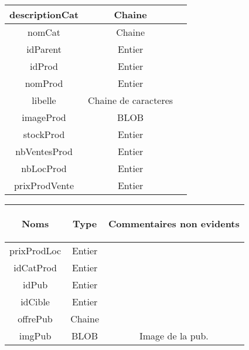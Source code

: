 \begin{tabular}{|c|c|c|}
\hline
	descriptionCat & Chaine & \\
\hline
	nomCat & Chaine & \\
\hline
	idParent & Entier & \\
\hline
	idProd & Entier & \\
\hline
	nomProd & Entier & \\
\hline
	libelle & Chaine de caracteres & \\
\hline
	imageProd & BLOB & \\
\hline
	stockProd & Entier & \\
\hline
	nbVentesProd & Entier & \\
\hline
	nbLocProd & Entier & \\
\hline
	prixProdVente & Entier & \\
\hline
\end{tabular}

\newpage

\begin{tabular}{|c|c|c|}
\hline
	\begin{bf}Noms\end{bf} &
	\begin{bf}Type\end{bf} &
	\begin{bf}Commentaires non evidents\end{bf}\\
\hline
	prixProdLoc & Entier & \\
\hline
	idCatProd & Entier & \\
\hline
	idPub & Entier & \\
\hline
	idCible & Entier & \\
\hline
	offrePub & Chaine & \\
\hline
	imgPub & BLOB & Image de la pub.\\
\hline
\end{tabular}
